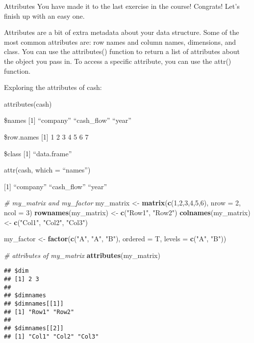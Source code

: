 \documentclass[]{article}
\newenvironment{Shaded}{\begin{snugshade}}{\end{snugshade}}
\newcommand{\KeywordTok}[1]{\textcolor[rgb]{0.13,0.29,0.53}{\textbf{#1}}}
\newcommand{\DataTypeTok}[1]{\textcolor[rgb]{0.13,0.29,0.53}{#1}}
\newcommand{\DecValTok}[1]{\textcolor[rgb]{0.00,0.00,0.81}{#1}}
\newcommand{\StringTok}[1]{\textcolor[rgb]{0.31,0.60,0.02}{#1}}
\newcommand{\CommentTok}[1]{\textcolor[rgb]{0.56,0.35,0.01}{\textit{#1}}}
\newcommand{\NormalTok}[1]{#1}
\begin{document}
Attributes You have made it to the last exercise in the course!
Congrats! Let's finish up with an easy one.

Attributes are a bit of extra metadata about your data structure. Some
of the most common attributes are: row names and column names,
dimensions, and class. You can use the attributes() function to return a
list of attributes about the object you pass in. To access a specific
attribute, you can use the attr() function.

Exploring the attributes of cash:

attributes(cash)

\$names {[}1{]} ``company'' ``cash\_flow'' ``year''

\$row.names {[}1{]} 1 2 3 4 5 6 7

\$class {[}1{]} ``data.frame''

attr(cash, which = ``names'')

{[}1{]} ``company'' ``cash\_flow'' ``year''

\begin{Shaded}
\begin{Highlighting}[]
\CommentTok{# my_matrix and my_factor}
\NormalTok{my_matrix <-}\StringTok{ }\KeywordTok{matrix}\NormalTok{(}\KeywordTok{c}\NormalTok{(}\DecValTok{1}\NormalTok{,}\DecValTok{2}\NormalTok{,}\DecValTok{3}\NormalTok{,}\DecValTok{4}\NormalTok{,}\DecValTok{5}\NormalTok{,}\DecValTok{6}\NormalTok{), }\DataTypeTok{nrow =} \DecValTok{2}\NormalTok{, }\DataTypeTok{ncol =} \DecValTok{3}\NormalTok{)}
\KeywordTok{rownames}\NormalTok{(my_matrix) <-}\StringTok{ }\KeywordTok{c}\NormalTok{(}\StringTok{"Row1"}\NormalTok{, }\StringTok{"Row2"}\NormalTok{)}
\KeywordTok{colnames}\NormalTok{(my_matrix) <-}\StringTok{ }\KeywordTok{c}\NormalTok{(}\StringTok{"Col1"}\NormalTok{, }\StringTok{"Col2"}\NormalTok{, }\StringTok{"Col3"}\NormalTok{)}

\NormalTok{my_factor <-}\StringTok{ }\KeywordTok{factor}\NormalTok{(}\KeywordTok{c}\NormalTok{(}\StringTok{"A"}\NormalTok{, }\StringTok{"A"}\NormalTok{, }\StringTok{"B"}\NormalTok{), }\DataTypeTok{ordered =}\NormalTok{ T, }\DataTypeTok{levels =} \KeywordTok{c}\NormalTok{(}\StringTok{"A"}\NormalTok{, }\StringTok{"B"}\NormalTok{))}

\CommentTok{# attributes of my_matrix}
\KeywordTok{attributes}\NormalTok{(my_matrix)}
\end{Highlighting}
\end{Shaded}

\begin{verbatim}
## $dim
## [1] 2 3
## 
## $dimnames
## $dimnames[[1]]
## [1] "Row1" "Row2"
## 
## $dimnames[[2]]
## [1] "Col1" "Col2" "Col3"
\end{verbatim}
\end{document}
